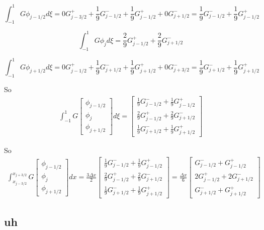 \documentclass[12pt]{article}
\begin{document}
\[\int_{-1}^{1} G \phi_{j-1/2}d \xi = 0G^+ _{j - 3/2} + \frac{1}{9}G^- _{j - 1/2} + \frac{1}{9}G^+ _{j - 1/2} + 0 G^- _{j + 1/2} = \frac{1}{9}G^- _{j - 1/2} + \frac{1}{9}G^+ _{j - 1/2}\]

\[\int_{-1}^{1} G \phi_{j}d \xi = \frac{2}{9}G^+ _{j - 1/2} +  \frac{2}{9}G^- _{j + 1/2} \]

\[\int_{-1}^{1} G \phi_{j+1/2}d \xi = 0G^+ _{j - 1/2} + \frac{1}{9}G^- _{j + 1/2} + \frac{1}{9}G^+ _{j + 1/2} + 0G^- _{j + 3/2} = \frac{1}{9}G^- _{j + 1/2} + \frac{1}{9}G^+ _{j + 1/2} \]

So 
\begin{multline*}
\int_{-1}^{1} G\left[\begin{array}{c}\phi_{j-1/2} \\\phi_{j}\\\phi_{j+1/2} \end{array}\right]  d \xi = \left[\begin{array}{c}  \frac{1}{9}G^- _{j - 1/2} + \frac{1}{9}G^+ _{j - 1/2} \\\frac{2}{9}G^+ _{j - 1/2} +  \frac{2}{9}G^- _{j + 1/2} \\\frac{1}{9}G^- _{j + 1/2} + \frac{1}{9}G^+ _{j + 1/2} \end{array}\right] 
\end{multline*}

So 
\begin{multline}
\int_{x_{j-3/2}}^{x_{j+3/2}}G\left[\begin{array}{c}\phi_{j-1/2} \\\phi_{j}\\\phi_{j+1/2} \end{array}\right]  dx =  \frac{3 \Delta x}{2} \left[\begin{array}{c}  \frac{1}{9}G^- _{j - 1/2} + \frac{1}{9}G^+ _{j - 1/2} \\\frac{2}{9}G^+ _{j - 1/2} +  \frac{2}{9}G^- _{j + 1/2} \\\frac{1}{9}G^- _{j + 1/2} + \frac{1}{9}G^+ _{j + 1/2} \end{array}\right] =  \frac{\Delta x}{6} \left[\begin{array}{c}  G^- _{j - 1/2} + G^+ _{j - 1/2} \\2G^+ _{j - 1/2} +  2G^- _{j + 1/2} \\G^- _{j + 1/2} + G^+ _{j + 1/2} \end{array}\right]
\end{multline}

\subsection{uh}
\end{document}
